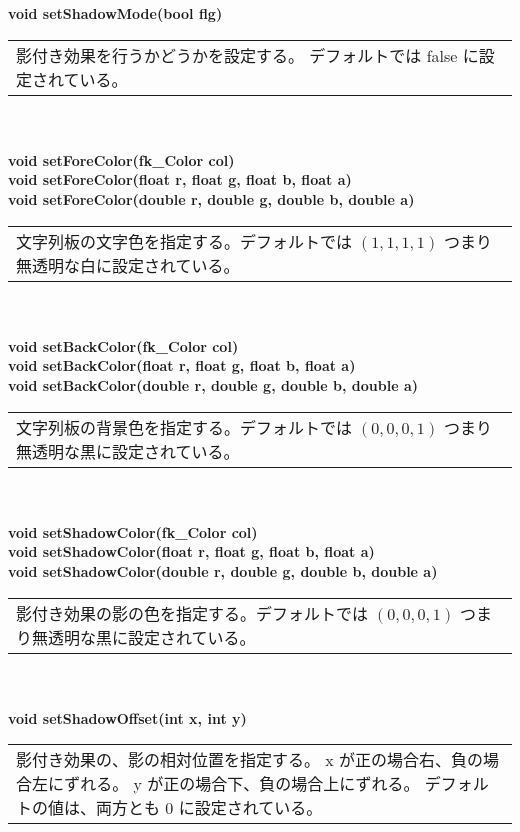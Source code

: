 \begin{tabbing}
\> \textbf{void setShadowMode(bool flg)} \\
	\> \> \begin{tabular}{p{15cm}}
		影付き効果を行うかどうかを設定する。
		デフォルトでは false に設定されている。
	\end{tabular} \\ \\

\> \textbf{void setForeColor(fk\_Color col)} \\
\> \textbf{void setForeColor(float r, float g, float b, float a)} \\
\> \textbf{void setForeColor(double r, double g, double b, double a)} \\
	\> \> \begin{tabular}{p{15cm}}
		文字列板の文字色を指定する。デフォルトでは
		\((1, 1, 1, 1)\) つまり無透明な白に設定されている。
	\end{tabular} \\ \\

\> \textbf{void setBackColor(fk\_Color col)} \\
\> \textbf{void setBackColor(float r, float g, float b, float a)} \\
\> \textbf{void setBackColor(double r, double g, double b, double a)} \\
	\> \> \begin{tabular}{p{15cm}}
		文字列板の背景色を指定する。デフォルトでは
		\((0, 0, 0, 1)\) つまり無透明な黒に設定されている。
	\end{tabular} \\ \\

\> \textbf{void setShadowColor(fk\_Color col)} \\
\> \textbf{void setShadowColor(float r, float g, float b, float a)} \\
\> \textbf{void setShadowColor(double r, double g, double b, double a)} \\
	\> \> \begin{tabular}{p{15cm}}
		影付き効果の影の色を指定する。デフォルトでは
		\((0, 0, 0, 1)\) つまり無透明な黒に設定されている。
	\end{tabular} \\ \\

\> \textbf{void setShadowOffset(int x, int y)} \\
	\> \> \begin{tabular}{p{15cm}}
		影付き効果の、影の相対位置を指定する。
		x が正の場合右、負の場合左にずれる。
		y が正の場合下、負の場合上にずれる。
		デフォルトの値は、両方とも 0 に設定されている。
	\end{tabular} \\ \\


\end{tabbing}
